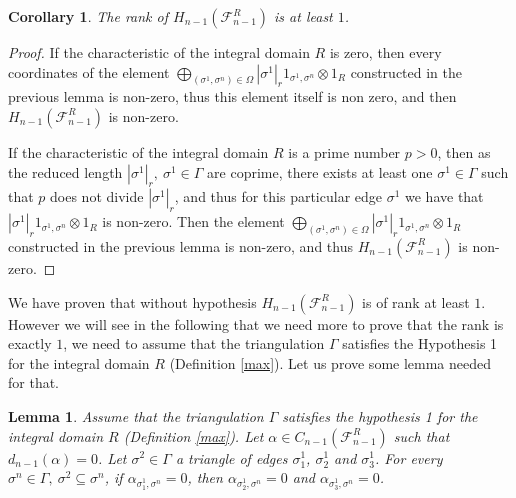 \documentclass{article}
\newtheorem{lemma}{Lemma}
\newtheorem{corollary}{Corollary}
\begin{document}
\begin{corollary}
    The rank of $H_{n-1}(\mathcal{F}_{n-1}^{R})$ is at least $1$.
\end{corollary}

\begin{proof}
    If the characteristic of the integral domain $R$ is zero, then every coordinates of the element $\bigoplus_{(\sigma^1,\sigma^n) \in \Omega} |\sigma^1|_r1_{\sigma^1,\sigma^n} \otimes 1_R$ constructed in the previous lemma is non-zero, thus this element itself is non zero, and then $H_{n-1}(\mathcal{F}_{n-1}^{R})$ is non-zero.

    If the characteristic of the integral domain $R$ is a prime number $p>0$, then as the reduced length $|\sigma^1|_r, ~\sigma^1 \in \Gamma$ are coprime, there exists at least one $\sigma^1 \in \Gamma$ such that $p$ does not divide $|\sigma^1|_r$, and thus for this particular edge $\sigma^1$ we have that $|\sigma^1|_r1_{\sigma^1,\sigma^n} \otimes 1_R$ is non-zero. Then the element $\bigoplus_{(\sigma^1,\sigma^n) \in \Omega} |\sigma^1|_r1_{\sigma^1,\sigma^n} \otimes 1_R$ constructed in the previous lemma is non-zero, and thus $H_{n-1}(\mathcal{F}_{n-1}^{R})$ is non-zero.
\end{proof}

We have proven that without hypothesis $H_{n-1}(\mathcal{F}_{n-1}^{R})$ is of rank at least $1$. However we will see in the following that we need more to prove that the rank is exactly $1$, we need to assume that the triangulation $\Gamma$ satisfies the Hypothesis 1 for the integral domain $R$ (Definition \ref{max}). Let us prove some lemma needed for that.

\begin{lemma}
    Assume that the triangulation $\Gamma$ satisfies the hypothesis 1 for the integral domain $R$ (Definition \ref{max}). Let $\alpha \in C_{n-1}(\mathcal{F}_{n-1}^{R})$ such that $d_{n-1}(\alpha) = 0$. Let $\sigma^2 \in \Gamma$ a triangle of edges $\sigma^1_1$, $\sigma^1_2$ and $\sigma^1_3$. For every $\sigma^n \in \Gamma, ~\sigma^2 \subseteq \sigma^n$, if $\alpha_{\sigma^1_1,\sigma^n} = 0$, then $\alpha_{\sigma^1_2,\sigma^n} = 0$ and $\alpha_{\sigma^1_3,\sigma^n} = 0$.
\end{lemma}
\end{document}
